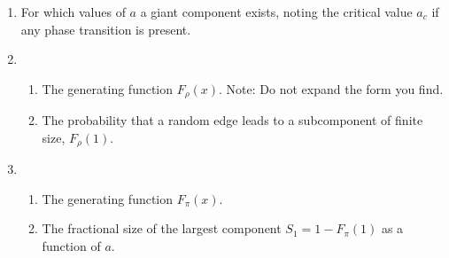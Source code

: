 \begin{enumerate}
\begin{enumerate}
\begin{enumerate}
           
   \solutionstart


   \solutionend

         \end{enumerate}


       \item 
         For which values of $a$ a giant component exists,
         noting the critical value $a_{c}$ if any phase
         transition is present.

         
   \solutionstart


   \solutionend

       \item
         \begin{enumerate}
         \item 
           The generating function $F_{\rho}(x)$.
           Note: Do not expand the form you find.

           
   \solutionstart


   \solutionend

         \item
           The probability that a random edge leads
           to a subcomponent of finite size, $F_{\rho}(1)$.

           
   \solutionstart


   \solutionend

         \end{enumerate}

       \item 
         \begin{enumerate}
         \item 
           The generating function $F_{\pi}(x)$.

           
   \solutionstart


   \solutionend

         \item
           The fractional size of the largest component
           $S_{1} = 1 - F_{\pi}(1)$ as a function of $a$.

           
   \solutionstart


   \solutionend


\end{enumerate}
\end{enumerate}
\end{enumerate}
